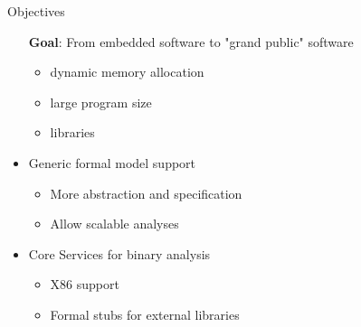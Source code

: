 









\begin{frame}{Objectives}
     \begin{itemize}
     \item[\textbf{Goal}:] From embedded software to "grand public" software
     \begin{itemize}
     \item dynamic memory allocation
     \item large program size
     \item libraries
     \end{itemize}
     \end{itemize}
     \begin{itemize}
     \item Generic formal model support
     \begin{itemize}
     \item More abstraction and specification
     \item Allow scalable analyses
     \end{itemize}
     \medskip
     \item Core Services for binary analysis
     \begin{itemize}
     \item X86 support
     \item Formal stubs for external libraries
     \end{itemize}
     \end{itemize}
\end{frame}




